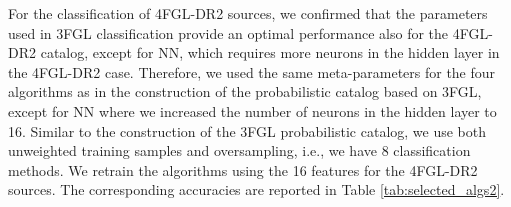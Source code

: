 For the classification of 4FGL-DR2 sources, we confirmed that the parameters used in 3FGL classification provide an optimal performance also for the 4FGL-DR2 catalog, except for NN, which requires more neurons in the hidden layer in the 4FGL-DR2 case.
Therefore, we used the same meta-parameters for the four algorithms as in the construction of the probabilistic catalog based on 3FGL, except for NN where we increased the number of neurons in the hidden layer to 16. Similar to the construction of the 3FGL probabilistic catalog, we use both unweighted training samples and oversampling, i.e., we have 8 classification methods.
We retrain the algorithms using the 16 features for the 4FGL-DR2 sources.
The corresponding accuracies are reported in Table \ref{tab:selected_algs2}.



